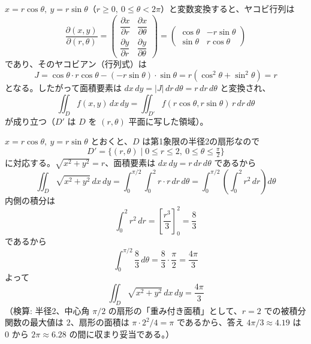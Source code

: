 
$x = r\cos\theta,\ y = r\sin\theta$（$r \ge 0,\ 0 \le \theta < 2\pi$）と変数変換すると、ヤコビ行列は
\[
\frac{\partial(x,y)}{\partial(r,\theta)} =
\begin{pmatrix}
\dfrac{\partial x}{\partial r} & \dfrac{\partial x}{\partial \theta} \\[4pt]
\dfrac{\partial y}{\partial r} & \dfrac{\partial y}{\partial \theta}
\end{pmatrix}
=
\begin{pmatrix}
\cos\theta & -r\sin\theta \\
\sin\theta & r\cos\theta
\end{pmatrix}
\]
であり、そのヤコビアン（行列式）は
\[
J = \cos\theta \cdot r\cos\theta - (-r\sin\theta)\cdot\sin\theta = r(\cos^{2}\theta + \sin^{2}\theta) = r
\]
となる。したがって面積要素は $dx\,dy = |J|\,dr\,d\theta = r\,dr\,d\theta$ と変換され、
\[
\iint_{D} f(x,y)\,dx\,dy = \iint_{D'} f(r\cos\theta, r\sin\theta)\, r\,dr\,d\theta
\]
が成り立つ（$D'$ は $D$ を $(r,\theta)$ 平面に写した領域）。

$x = r\cos\theta,\ y = r\sin\theta$ とおくと、$D$ は第1象限の半径2の扇形なので
\[
D' = \{(r,\theta) \mid 0 \le r \le 2,\ 0 \le \theta \le \tfrac{\pi}{2}\}
\]
に対応する。$\sqrt{x^2+y^2} = r$、面積要素は $dx\,dy = r\,dr\,d\theta$ であるから
\[
\iint_{D} \sqrt{x^{2}+y^{2}}\,dx\,dy = \int_{0}^{\pi/2}\int_{0}^{2} r \cdot r\,dr\,d\theta
= \int_{0}^{\pi/2}\left(\int_{0}^{2} r^{2}\,dr\right)d\theta
\]
内側の積分は
\[
\int_{0}^{2} r^{2}\,dr = \left[\frac{r^{3}}{3}\right]_{0}^{2} = \frac{8}{3}
\]
であるから
\[
\int_{0}^{\pi/2} \frac{8}{3}\,d\theta = \frac{8}{3}\cdot\frac{\pi}{2} = \frac{4\pi}{3}
\]
よって
\[
\boxed{\; \iint_{D} \sqrt{x^{2}+y^{2}}\,dx\,dy = \frac{4\pi}{3} \;}
\]
（検算: 半径2、中心角 $\pi/2$ の扇形の「重み付き面積」として、$r=2$ での被積分関数の最大値は $2$、扇形の面積は $\pi\cdot2^2/4=\pi$ であるから、答え $4\pi/3 \approx 4.19$ は $0$ から $2\pi\approx6.28$ の間に収まり妥当である。）
